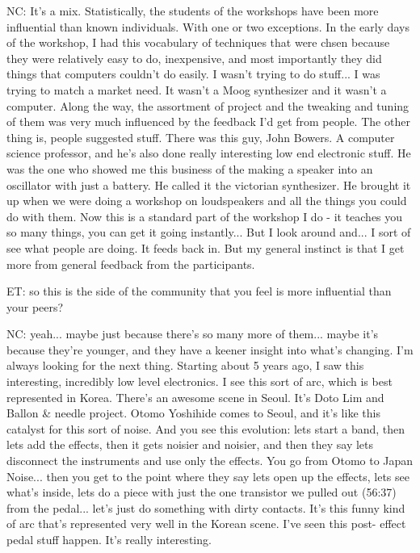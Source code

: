 NC: It's a mix. Statistically, the students of the workshops have been more influential than known individuals. With one or two exceptions. In the early days of the workshop, I had this vocabulary of techniques that were chsen because they were relatively easy to do, inexpensive, and most importantly they did things that computers couldn't do easily. I wasn't trying to do stuff... I was trying to match a market need. It wasn't a Moog synthesizer and it wasn't a computer. Along the way, the assortment of project and the tweaking and tuning of them was very much influenced by the feedback I'd get from people. The other thing is, people suggested stuff. There was this guy, John Bowers. A computer science professor, and he's also done really interesting low end electronic stuff. He was the one who showed me this business of the making a speaker into an oscillator with just a battery. He called it the victorian synthesizer. He brought it up when we were doing a workshop on loudspeakers and all the things you could do with them. Now this is a standard part of the workshop I do - it teaches you so many things, you can get it going instantly... But I look around and... I sort of see what people are doing. It feeds back in. But my general instinct is that I get more from general feedback from the participants. 

ET: so this is the side of the community that you feel is more influential than your peers? 

NC: yeah... maybe just because there's so many more of them... maybe it's because they're younger, and they have a keener insight into what's changing. I'm always looking for the next thing. Starting about 5 years ago, I saw this interesting, incredibly low level electronics. I see this sort of arc, which is best represented in Korea. There's an awesome scene in Seoul. It's Doto Lim and Ballon \& needle project. Otomo Yoshihide comes to Seoul, and it's like this catalyst for this sort of noise. And you see this evolution: lets start a band, then lets add the effects, then it gets noisier and noisier, and then they say lets disconnect the instruments and use only the effects. You go from Otomo to Japan Noise... then you get to the point where they say lets open up the effects, lets see what's inside, lets do a piece with just the one transistor we pulled out (56:37) from the pedal... let's just do something with dirty contacts. It's this funny kind of arc that's represented very well in the Korean scene. I've seen this post- effect pedal stuff happen. It's really interesting. 

